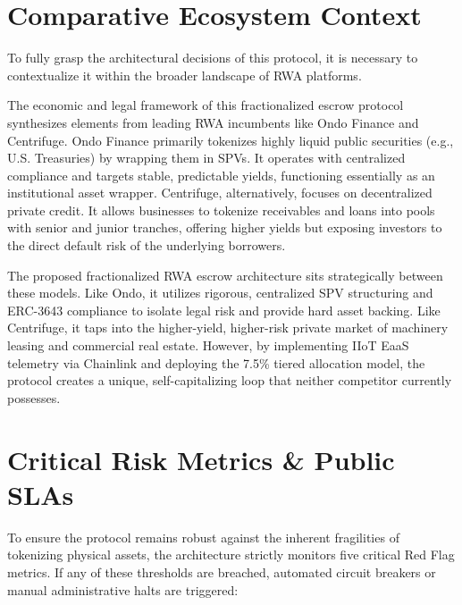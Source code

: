 \documentclass[12pt, a4paper]{article}
\begin{document}
\section{Comparative Ecosystem Context}
To fully grasp the architectural decisions of this protocol, it is necessary to contextualize it within the broader landscape of RWA platforms.

The economic and legal framework of this fractionalized escrow protocol synthesizes elements from leading RWA incumbents like Ondo Finance and Centrifuge. Ondo Finance primarily tokenizes highly liquid public securities (e.g., U.S. Treasuries) by wrapping them in SPVs. It operates with centralized compliance and targets stable, predictable yields, functioning essentially as an institutional asset wrapper. Centrifuge, alternatively, focuses on decentralized private credit. It allows businesses to tokenize receivables and loans into pools with senior and junior tranches, offering higher yields but exposing investors to the direct default risk of the underlying borrowers.

The proposed fractionalized RWA escrow architecture sits strategically between these models. Like Ondo, it utilizes rigorous, centralized SPV structuring and ERC-3643 compliance to isolate legal risk and provide hard asset backing. Like Centrifuge, it taps into the higher-yield, higher-risk private market of machinery leasing and commercial real estate. However, by implementing IIoT EaaS telemetry via Chainlink and deploying the 7.5\% tiered allocation model, the protocol creates a unique, self-capitalizing loop that neither competitor currently possesses.

\section{Critical Risk Metrics \& Public SLAs}
To ensure the protocol remains robust against the inherent fragilities of tokenizing physical assets, the architecture strictly monitors five critical Red Flag metrics. If any of these thresholds are breached, automated circuit breakers or manual administrative halts are triggered:
\end{document}
